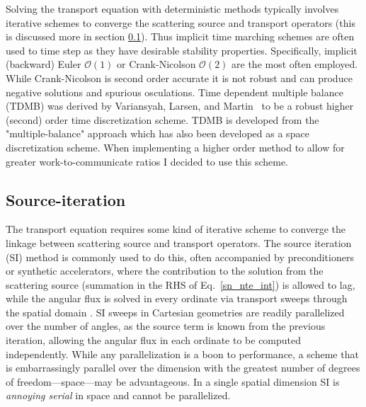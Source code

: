 Solving the transport equation with deterministic methods typically involves iterative schemes to converge the scattering source and transport operators (this is discussed more in section \ref{sec:intro_itterative-scheme}).
Thus implicit time marching schemes are often used to time step as they have desirable stability properties.
Specifically, implicit (backward) Euler $\mathcal{O}(1)$ or Crank-Nicolson $\mathcal{O}(2)$ are the most often employed.
While Crank-Nicolson is second order accurate it is not robust and can produce negative solutions and spurious osculations.
Time dependent multiple balance (TDMB) was derived by Variansyah, Larsen, and Martin~\cite{variansyah_robust_2021, ilham_phd} to be a robust higher (second) order time discretization scheme.
TDMB is developed from the "multiple-balance" approach which has also been developed as a space discretization scheme.
When implementing a higher order method to allow for greater work-to-communicate ratios I decided to use this scheme. 

\subsection{Source-iteration}
\label{sec:intro_itterative-scheme}

The transport equation requires some kind of iterative scheme to converge the linkage between scattering source and transport operators.
The source iteration (SI) method is commonly used to do this, often accompanied by preconditioners or synthetic accelerators, where the contribution to the solution from the scattering source (summation in the RHS of Eq.~\eqref{sn_nte_int}) is allowed to lag, while the angular flux is solved in every ordinate via transport sweeps through the spatial domain \cite{adams_subcell_1997}.
SI sweeps in Cartesian geometries are readily parallelized over the number of angles, as the source term is known from the previous iteration, allowing the angular flux in each ordinate to be computed independently. 
While any parallelization is a boon to performance, a scheme that is embarrassingly parallel over the dimension with the greatest number of degrees of freedom---space---may be advantageous.
In a single spatial dimension SI is \textit{annoying serial} in space and cannot be parallelized.

